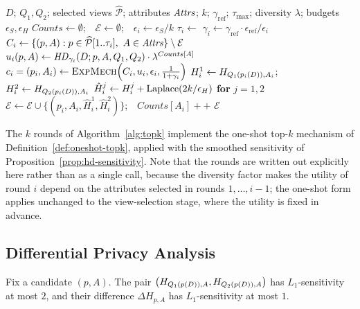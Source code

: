 \begin{algorithm}[t]
\caption{Find-Top-$k$-Explanations}
\label{alg:topk}
\begin{algorithmic}[1]
\Require $D$; $Q_1,Q_2$; selected views $\widehat{\mathcal{P}}$; attributes $\mathit{Attrs}$; $k$; $\gamma_{\text{ref}}$; $\tau_{\max}$; diversity $\lambda$; budgets $\epsilon_S,\epsilon_H$
\State $Counts\gets\emptyset$;\ \ $\mathcal{E}\gets\emptyset$;\ \ $\epsilon_i \gets \epsilon_S/k$
  \State $\tau_i \gets$  
  \State $\gamma_i \gets \gamma_{\text{ref}}\cdot \epsilon_{\text{ref}}/\epsilon_i$ 
  \State $C_i \gets \{(p,A): p\in\widehat{\mathcal{P}}[1..\tau_i],\ A\in \mathit{Attrs}\}\setminus \mathcal{E}$
  \State $u_i(p,A)\gets \mathit{HD}_{\gamma_i}(D;p,A,Q_1,Q_2)\cdot \lambda^{Counts[A]}$
  \State $c_i=(p_i,A_i)\gets \textsc{ExpMech}\!\left(C_i,u_i,\epsilon_i,\tfrac{1}{1+\gamma_i}\right)$
  \State $H^1_i\gets H_{Q_1(p_i(D)),A_i}$;\ \ $H^2_i\gets H_{Q_2(p_i(D)),A_i}$
  \State $\hat H^j_i\gets H^j_i+\operatorname{Laplace}(2k/\epsilon_H)$ \textbf{for} $j=1,2$
  \State $\mathcal{E}\gets\mathcal{E}\cup\{(p_i,A_i,\hat H^1_i,\hat H^2_i)\}$;\ \ $Counts[A_i]{+}{+}$
\EndFor
\State \Return $\mathcal{E}$
\end{algorithmic}
\end{algorithm}

The $k$ rounds of Algorithm~\ref{alg:topk} implement the one-shot top-$k$ mechanism of Definition~\ref{def:oneshot-topk}, applied with the smoothed sensitivity of Proposition~\ref{prop:hd-sensitivity}.
Note that the rounds are written out explicitly here rather than as a single call, because the diversity factor makes the utility of round $i$ depend on the attributes selected in rounds $1,\dots,i-1$; the one-shot form applies unchanged to the view-selection stage, where the utility is fixed in advance.

\subsection{Differential Privacy Analysis}
\label{subsec:dp-proof}

\begin{proposition}
\label{prop:histogram-release-sensitivity}
Fix a candidate $(p,A)$. The pair $\big(H_{Q_1(p(D)),A},H_{Q_2(p(D)),A}\big)$ has $L_1$-sensitivity at most $2$, and their difference $\Delta H_{p,A}$ has $L_1$-sensitivity at most $1$.
\end{proposition}

